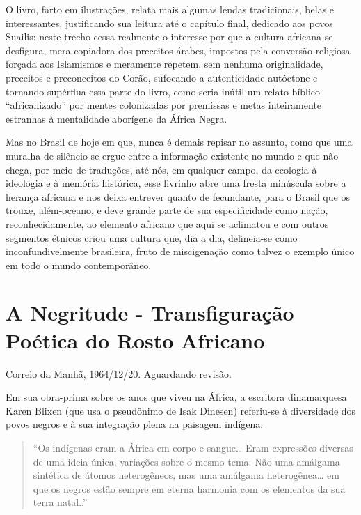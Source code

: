 \documentclass[
  letterpaper,
  DIV=11,
  numbers=noendperiod]{scrreprt}
\begin{document}
O livro, farto em ilustrações, relata mais algumas lendas tradicionais,
belas e interessantes, justificando sua leitura até o capítulo final,
dedicado aos povos Suailis: neste trecho cessa realmente o interesse por
que a cultura africana se desfigura, mera copiadora dos preceitos
árabes, impostos pela conversão religiosa forçada aos Islamismos e
meramente repetem, sem nenhuma originalidade, preceitos e preconceitos
do Corão, sufocando a autenticidade autóctone e tornando supérflua essa
parte do livro, como seria inútil um relato bíblico ``africanizado'' por
mentes colonizadas por premissas e metas inteiramente estranhas à
mentalidade aborígene da África Negra.

Mas no Brasil de hoje em que, nunca é demais repisar no assunto, como
que uma muralha de silêncio se ergue entre a informação existente no
mundo e que não chega, por meio de traduções, até nós, em qualquer
campo, da ecologia à ideologia e à memória histórica, esse livrinho abre
uma fresta minúscula sobre a herança africana e nos deixa entrever
quanto de fecundante, para o Brasil que os trouxe, além-oceano, e deve
grande parte de sua especificidade como nação, reconhecidamente, ao
elemento africano que aqui se aclimatou e com outros segmentos étnicos
criou uma cultura que, dia a dia, delineia-se como inconfundivelmente
brasileira, fruto de miscigenação como talvez o exemplo único em todo o
mundo contemporâneo.

\chapter{A Negritude - Transfiguração Poética do Rosto
Africano}\label{a-negritude---transfigurauxe7uxe3o-pouxe9tica-do-rosto-africano}

Correio da Manhã, 1964/12/20. Aguardando revisão.

\hfill\break

Em sua obra-prima sobre os anos que viveu na África, a escritora
dinamarquesa Karen Blixen (que usa o pseudônimo de Isak Dinesen)
referiu-se à diversidade dos povos negros e à sua integração plena na
paisagem indígena:

\begin{quote}
``Os indígenas eram a África em corpo e sangue\ldots{} Eram expressões
diversas de uma ideia única, variações sobre o mesmo tema. Não uma
amálgama sintética de átomos heterogêneos, mas uma amálgama
heterogênea\ldots{} em que os negros estão sempre em eterna harmonia com
os elementos da sua terra natal..''
\end{quote}
\end{document}
